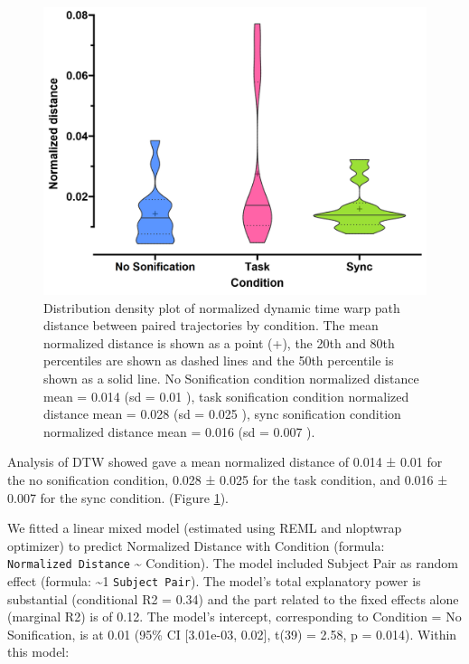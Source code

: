 \documentclass[10pt,a4paper,onecolumn]{article}
\begin{document}
\begin{figure}[h]

{\centering \includegraphics[width=1\linewidth]{figures/dtw_summary} 

}

\caption{Distribution density plot of normalized dynamic time warp path distance between paired trajectories by condition. The mean normalized distance is shown as a point (+), the 20th and 80th percentiles are shown as dashed lines and the 50th percentile is shown as a solid line. No Sonification condition normalized distance mean  =  0.014 (sd =  0.01 ), task sonification condition normalized distance mean =  0.028 (sd =  0.025 ), sync sonification condition normalized distance mean =  0.016 (sd =  0.007 ).}\label{fig:dtw-plot}
\end{figure}

Analysis of DTW showed gave a mean normalized distance of 0.014 ± 0.01 for the no sonification condition,
0.028 ± 0.025 for the task condition, and
0.016 ± 0.007 for the sync condition. (Figure \ref{fig:dtw-plot}).

We fitted a linear mixed model (estimated using REML and nloptwrap optimizer) to predict Normalized Distance with Condition (formula: \texttt{Normalized\ Distance} \textasciitilde{} Condition). The model included Subject Pair as random effect (formula: \textasciitilde1 \textbar{} \texttt{Subject\ Pair}). The model's total explanatory power is substantial (conditional R2 = 0.34) and the part related to the fixed effects alone (marginal R2) is of 0.12. The model's intercept, corresponding to Condition = No Sonification, is at 0.01 (95\% CI {[}3.01e-03, 0.02{]}, t(39) = 2.58, p = 0.014). Within this model:
\end{document}
